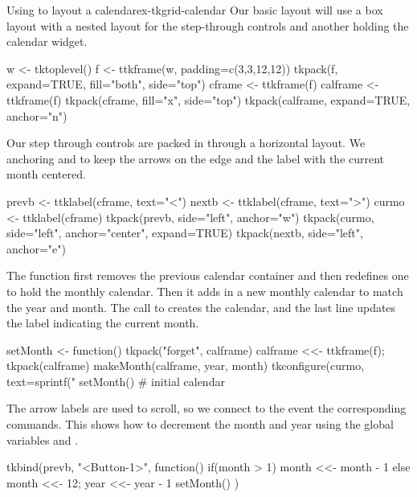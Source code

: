 \begin{example}{Using  to layout a calendar}{ex-tkgrid-calendar}
Our basic layout will use a box layout with a nested layout
for the step-through controls and another holding the calendar widget.
\begin{Schunk}
\begin{Sinput}
 w <- tktoplevel()
 f <- ttkframe(w, padding=c(3,3,12,12))
 tkpack(f, expand=TRUE, fill="both", side="top")
 cframe <- ttkframe(f)
 calframe <- ttkframe(f)
 tkpack(cframe, fill="x", side="top")
 tkpack(calframe, expand=TRUE, anchor="n")
\end{Sinput}
\end{Schunk}

Our step through controls are packed in through a horizontal
layout. We anchoring and  to keep the arrows on the edge and the
label with the current month centered.
\begin{Schunk}
\begin{Sinput}
 prevb <- ttklabel(cframe, text="<")
 nextb <- ttklabel(cframe, text=">")
 curmo <- ttklabel(cframe)
 tkpack(prevb, side="left", anchor="w")
 tkpack(curmo, side="left", anchor="center", expand=TRUE)
 tkpack(nextb, side="left", anchor="e")
\end{Sinput}
\end{Schunk}

The  function first removes the previous calendar
container and then
redefines one to hold the monthly calendar. Then it adds in a new
monthly calendar to match the year and month. The call to
 creates the calendar, and the last line updates the
label indicating the current month.
\begin{Schunk}
\begin{Sinput}
 setMonth <- function() {
   tkpack("forget", calframe)
   calframe <<- ttkframe(f); tkpack(calframe)
   makeMonth(calframe, year, month)
   tkconfigure(curmo, text=sprintf("%
 }
 setMonth()                              # initial calendar
\end{Sinput}
\end{Schunk}

The arrow labels are used to scroll, so we connect to the
 event the corresponding commands. This shows how to decrement the month and year using the
global variables  and . 
\begin{Schunk}
\begin{Sinput}
 tkbind(prevb, "<Button-1>", function() {
   if(month > 1) {
     month <<- month - 1
   } else {
     month <<- 12; year <<- year - 1
   }
   setMonth()
 })
\end{Sinput}
\end{Schunk}


\end{example}

